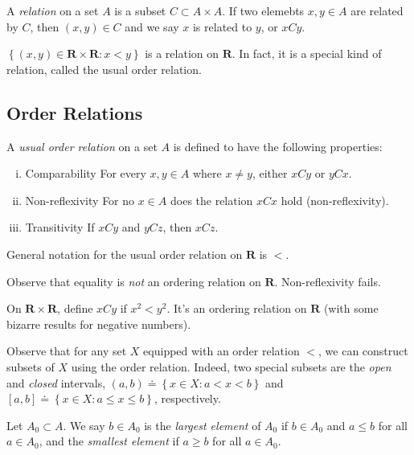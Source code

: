 \begin{definition}
A \emph{relation} on a set $A$ is a subset $C \subset A \times A$.
If two elemebts $x, y \in A$ are related by $C$, then $(x,y) \in C$ and
we say $x$ is related to $y$, or $xCy$.
\end{definition}
\begin{example}
$\left\{ (x,y) \in \mathbf{R} \times \mathbf{R}: x<y \right\}$ is a relation on $\mathbf{R}$.
In fact, it is a special kind of relation, called the usual order relation.
\end{example}

\subsection{Order Relations}
\begin{definition}
A \emph{usual order relation } on a set $A$ is defined to have the following
properties:
\begin{enumerate}[(i)]
  \item{Comparability} For every $x,y \in A$ where $x \neq y$, either $xCy$ or $yCx$.
  \item{Non-reflexivity} For no $x \in A$ does the relation $xCx$ hold (non-reflexivity).
  \item{Transitivity} If $xCy$ and $yCz$, then $xCz$.
\end{enumerate}
General notation for the usual order relation on $\mathbf{R}$ is $<$.
\end{definition}
\begin{remark}\label{rem:}
Observe that equality is \emph{not} an ordering relation on $\mathbf{R}$. Non-reflexivity
fails.
\end{remark}
\begin{example}
On $\mathbf{R} \times \mathbf{R}$, define $xCy$ if $x^{2} < y^{2}$. It's an ordering
relation on $\mathbf{R}$ (with some bizarre results for negative numbers).
\end{example}
Observe that for any set $X$ equipped with an order relation $<$, we can
construct subsets of $X$ using the order relation. Indeed, two special
subsets are the \emph{open} and \emph{closed} intervals,
$(a,b)\doteq \left\{ x \in X: a < x < b \right\}$ and $[a,b] \doteq \left\{ x
\in X: a \le x \le b
\right\}$, respectively.

Let $A_{0}  \subset A$. We say $b \in A_{0}$ is the \emph{largest element} of
$A_{0}$ if $b \in A_{0}$ and $a \le b$ for all $a \in A_{0}$, and the
\emph{smallest element} if $a \ge b$ for all $a \in A_{0}$.

